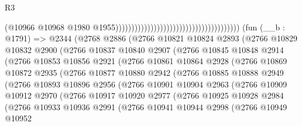 \begin{lexlean}{R3}
\begin{coremodule}
                                                                                (@10966
                                                                                  @10968
                                                                                  @1980
                                                                                  @1955)))))))))))))))))))))))))))))))))))))))
    (fun (__b : @1791) =>
    @2344
      (@2768
        @2886
        (@2766
          @10821
          @10824
          @2893
          (@2766
            @10829
            @10832
            @2900
            (@2766
              @10837
              @10840
              @2907
              (@2766
                @10845
                @10848
                @2914
                (@2766
                  @10853
                  @10856
                  @2921
                  (@2766
                    @10861
                    @10864
                    @2928
                    (@2766
                      @10869
                      @10872
                      @2935
                      (@2766
                        @10877
                        @10880
                        @2942
                        (@2766
                          @10885
                          @10888
                          @2949
                          (@2766
                            @10893
                            @10896
                            @2956
                            (@2766
                              @10901
                              @10904
                              @2963
                              (@2766
                                @10909
                                @10912
                                @2970
                                (@2766
                                  @10917
                                  @10920
                                  @2977
                                  (@2766
                                    @10925
                                    @10928
                                    @2984
                                    (@2766
                                      @10933
                                      @10936
                                      @2991
                                      (@2766
                                        @10941
                                        @10944
                                        @2998
                                        (@2766
                                          @10949
                                          @10952

\end{coremodule}
\end{lexlean}
